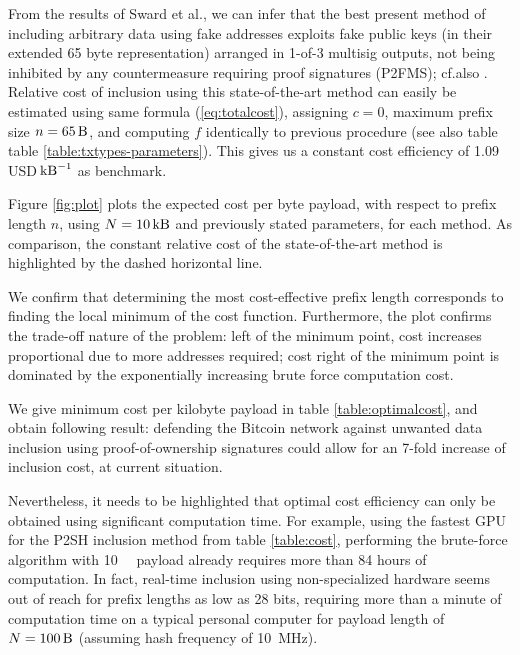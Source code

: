 \documentclass[a4paper,11pt,titlepage]{scrbook}
\begin{document}
From the results of Sward et al., we can infer that the best present method of including arbitrary data using fake addresses exploits fake public keys (in their extended 65 byte representation) arranged in 1-of-3 multisig outputs, not being inhibited by any countermeasure requiring proof signatures (P2FMS); cf.\@ also \cite[Table 3]{sward_data_2018}.
Relative cost of inclusion using this state-of-the-art method can easily be estimated using same formula (\ref{eq:totalcost}), assigning $c=0$, maximum prefix size $n=\SI{65}{\byte}$, and computing $f$ identically to previous procedure (see also table table \ref{table:txtypes-parameters}).
This gives us a constant cost efficiency of \num{1.09} USD$\,\si{\per\kilo\byte}$ as benchmark.

Figure \ref{fig:plot} plots the expected cost per byte payload, with respect to prefix length $n$, using $N=\SI{10}{\kilo\byte}$ and previously stated parameters, for each method.
As comparison, the constant relative cost of the state-of-the-art method is highlighted by the dashed horizontal line. 

We confirm that determining the most cost-effective prefix length corresponds to finding the local minimum of the cost function.
Furthermore, the plot confirms the trade-off nature of the problem: left of the minimum point, cost increases proportional due to more addresses required; cost right of the minimum point is dominated by the exponentially increasing brute force computation cost.

We give minimum cost per kilobyte payload in table \ref{table:optimalcost},
and obtain following result: 
defending the Bitcoin network against unwanted data inclusion using proof-of-ownership signatures could allow for an 7-fold increase of inclusion cost, at current situation.

Nevertheless, it needs to be highlighted that optimal cost efficiency can only be obtained using significant computation time.
For example, using the fastest GPU for the P2SH inclusion method from table \ref{table:cost}, performing the brute-force algorithm with \SI{10}{\kilo\byte} payload already requires more than 84 hours of computation.
In fact, real-time inclusion using non-specialized hardware seems out of reach for prefix lengths as low as 28 bits, requiring more than a minute of computation time on a typical personal computer for payload length of $N=\SI{100}{\byte}$ (assuming hash frequency of \SI{10}{\mega\hertz}).
\end{document}
